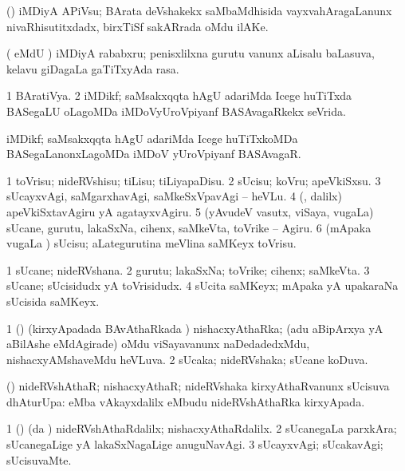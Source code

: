 \bentry
{}
\gl{\nA}
\bmng
(\ca) iMDiyA APiVsu; BArata deVshakekx saMbaMdhisida vayxvahAragaLanunx nivaRhisutitxdadx, birxTiSf sakARrada oMdu ilAKe. 
\emng
\eentry

\bentry
{}
\gl{\nA}
\bmng
( eMdU \parx) iMDiyA rababxru; penisxlilxna gurutu \mo vanunx aLisalu baLasuva, kelavu giDagaLa gaTiTxyAda rasa. 
\emng
\eentry

\bentry
{}
\gl{\gu}
\bmng
\bnum
\num{1} BAratiVya. 
\num{2} iMDikf; saMsakxqqta hAgU adariMda Icege huTiTxda BASegaLU oLagoMDa iMDoVyUroVpiyanf BASAvagaRkekx seVrida. 
\enum
\emng
\eentry

\bentry
{}
\gl{\nA}
\bmng
iMDikf; saMsakxqqta hAgU adariMda Icege huTiTxkoMDa BASegaLanonxLagoMDa iMDoV yUroVpiyanf BASAvagaR. 
\emng
\eentry

\bentry
{}
\gl{\sakirx}
\bmng
\bnum
\num{1} toVrisu; nideRVshisu; tiLisu; tiLiyapaDisu. 
\num{2} sUcisu; koVru; apeVkiSxsu. 
\num{3} sUcayxvAgi, saMgarxhavAgi, saMkeSxVpavAgi -- heVLu. 
\num{4} (\veYshA, \BUkaq dalilx) apeVkiSxtavAgiru yA agatayxvAgiru. 
\num{5} (yAvudeV vasutx, viSaya, \mo vugaLa) sUcane, gurutu, lakaSxNa, cihenx, saMkeVta, toVrike -- Agiru. 
\num{6} (mApaka \mo vugaLa \vi) sUcisu; aLategurutina meVlina saMKeyx toVrisu. 
\enum
\emng
\eentry

\bentry
{}
\gl{\nA}
\bmng
\bnum
\num{1} sUcane; nideRVshana. 
\num{2} gurutu; lakaSxNa; toVrike; cihenx; saMkeVta. 
\num{3} sUcane; sUcisidudx yA toVrisidudx. 
\num{4} sUcita saMKeyx; mApaka yA upakaraNa sUcisida saMKeyx. 
\enum
\emng
\eentry

\bentry
{}
\gl{\gu}
\bmng
\bnum
\num{1} (\vAyx) (kirxyApadada BAvAthaRkada \vi) nishacxyAthaRka; (adu aBipArxya yA aBilAshe eMdAgirade) oMdu viSayavanunx naDedadedxMdu, nishacxyAMshaveMdu heVLuva. 
\hypertarget{indicative(1)2}{} 
\num{2} sUcaka; nideRVshaka; sUcane koDuva. 
\enum
\emng
\eentry

\bentry
{}
\gl{\nA}
\bmng
(\vAyx) nideRVshAthaR; nishacxyAthaR; nideRVshaka kirxyAthaRvanunx sUcisuva dhAturUpa:  eMba vAkayxdalilx  eMbudu nideRVshAthaRka kirxyApada. 
\emng
\eentry

\bentry
{}
\gl{\kirxvi}
\bmng
\bnum
\num{1} (\vAyx) (\kirx da \vi) nideRVshAthaRdalilx; nishacxyAthaRdalilx. 
\num{2} sUcanegaLa parxkAra; sUcanegaLige yA lakaSxNagaLige anuguNavAgi. 
\num{3} sUcayxvAgi; sUcakavAgi; sUcisuvaMte. 
\enum
\emng
\eentry

